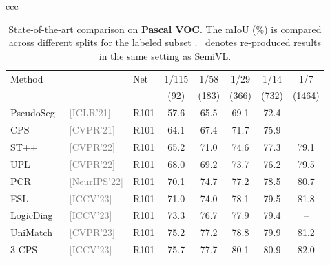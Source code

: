 \documentclass[10pt,twocolumn,letterpaper]{article}
\newcommand{\ours}{SemiVL}
\newcommand{\venue}[1]{{\tiny\textcolor{gray}{[#1]}}}
\begin{document}
\begin{figure*}
\begin{tabular}{ccc}
\begin{table}
\caption{State-of-the-art comparison on \textbf{Pascal VOC}. The mIoU (\%) is compared across different splits for the labeled subset .
~denotes re-produced results in the same setting as \ours.
}
\label{tab:sota_voc}
\centering
\scriptsize
\setlength{\tabcolsep}{2pt}
\begin{tabular}{lllccccc}
\toprule
   \multirow{2}{*}{Method} &                &     \multirow{2}{*}{Net} &     1/115 &    1/58 &    1/29 &    1/14 &    1/7 \\
   & & & (92) & (183) & (366) & (732) & (1464) \\ 
\midrule
PseudoSeg~\cite{zou2020pseudoseg} & \venue{ICLR'21} & R101 & 57.6 & 65.5 & 69.1 & 72.4 & -- \\
                     CPS~\cite{chen2021semi} &                        \venue{CVPR'21} &                      R101 &           64.1 &           67.4 &           71.7 &           75.9 &             -- \\
                    ST++~\cite{yang2022st++} &                        \venue{CVPR'22} &                      R101 &           65.2 &           71.0 &           74.6 &           77.3 &           79.1 \\
                 UPL~\cite{wang2022semi} &                        \venue{CVPR'22} &                      R101 &           68.0 &           69.2 &           73.7 &           76.2 &           79.5 \\
                      PCR~\cite{xu2022semi} &                     \venue{NeurIPS'22} &                      R101 &           70.1 &           74.7 &           77.2 &           78.5 &           80.7 \\
                   ESL~\cite{ma2023enhanced} &                        \venue{ICCV'23} &                      R101 &           71.0 &           74.0 &           78.1 &           79.5 &           81.8 \\
             LogicDiag~\cite{liang2023logic} &                        \venue{ICCV'23} &                      R101 &           73.3 &           76.7 &           77.9 &           79.4 &             -- \\
          UniMatch~\cite{yang2023revisiting} &                        \venue{CVPR'23} &                      R101 &           75.2 &           77.2 &           78.8 &           79.9 &           81.2 \\
                  3-CPS~\cite{li2023diverse} &                        \venue{ICCV'23} &                      R101 &           75.7 &           77.7 &           80.1 &           80.9 &           82.0 \\

\end{tabular}
\end{table}
\end{tabular}
\end{figure*}
\end{document}

